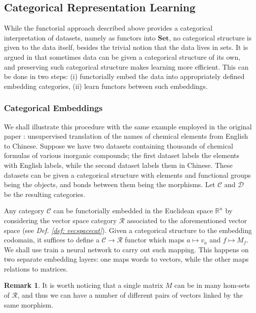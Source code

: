 \documentclass[11pt,a4paper,openright,twoside]{report}
\theoremstyle{plain}
\theoremstyle{definition}
\newtheorem{remark}[proposition]{Remark}
\begin{document}
\subsection{Categorical Representation Learning}


While the functorial approach described above provides a categorical interpretation of datasets, namely as functors into $\mathbf{Set}$, no categorical structure is given to the data itself, besides the trivial notion that the data lives in sets. It is argued in \cite{sheshmaniCategoricalRepresentationLearning2022} that sometimes data can be given a categorical structure of its own, and preserving such categorical structure makes learning more efficient. This can be done in two steps: (i) functorially embed the data into appropriately defined embedding categories, (ii) learn functors between such embeddings. 


\subsubsection{Categorical Embeddings}

We shall illustrate this procedure with the same example employed in the original paper \cite{sheshmaniCategoricalRepresentationLearning2022}: unsupervised translation of the names of chemical elements from English to Chinese. Suppose we have two datasets containing thousands of chemical formulas of various inorganic compounds; the first dataset labels the elements with English labels, while the second dataset labels them in Chinese. These datasets can be given a categorical structure with elements and functional groups being the objects, and bonds between them being the morphisms. Let $\mathcal{C}$ and $\mathcal{D}$ be the resulting categories.


Any category $\mathcal{C}$ can be functorially embedded in the Euclidean space $\mathbb{R}^n$ by considering the vector space category $\mathcal{R}$ associated to the aforementioned vector space (see \textit{Def. \ref{def: vecspacecat}}). Given a categorical structure to the embedding codomain, it suffices to define a $\mathcal{C} \to \mathcal{R}$ functor which maps $a \mapsto v_a$ and $f \mapsto M_f$. We shall use train a neural network to carry out such mapping. This happens on two separate embedding layers: one maps words to vectors, while the other maps relations to matrices.  

\begin{remark}
  It is worth noticing that a single matrix $M$ can be in many hom-sets of $\mathcal{R}$, and thus we can have a number of different pairs of vectors linked by the same morphism.
\end{remark}
\end{document}
